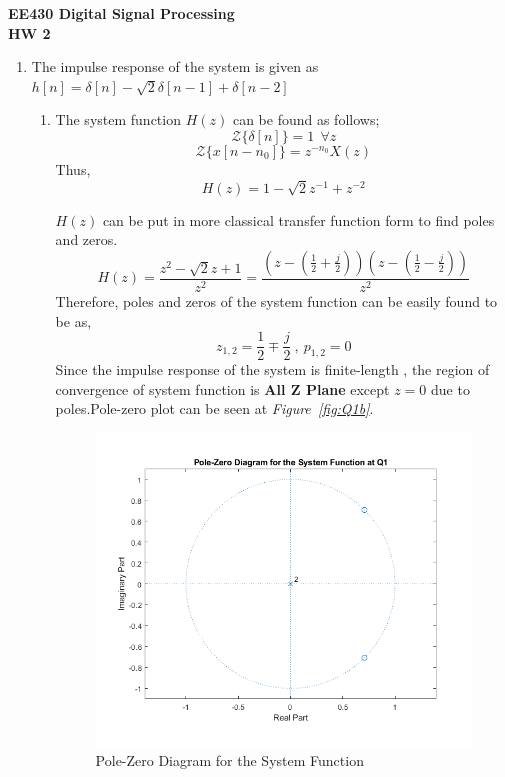 \documentclass[a4paper,12pt]{article}
\begin{document}
\begin{center}
	\textbf{\large EE430 Digital Signal Processing \\[0.2cm] HW 2} \\
\end{center}

\begin{enumerate}
	\item The impulse response of the system is given as $h[n]=\delta [n]-\sqrt{2}\delta [n-1]+\delta [n-2]$	
		
		\begin{enumerate} 
			\item The system function $H(z)$ can be found as follows;
				$$	\mathcal{Z} \{	\delta [n]\} = 1 \ \ \forall z	$$
				$$	\mathcal{Z} \{ x[n-n_0] \} = z^{-n_0}X(z)	$$ 
				Thus,
				$$\boxed{	H(z)= 1-\sqrt{2} z^{-1}+z^{-2}	 }$$
			
			$H(z)$ can be put in more classical transfer  function form to find poles and zeros. 
			$$	H(z)= \frac{z^2-\sqrt{2}z + 1}{z^2}=\frac{\left(z-(\frac{1}{2}+\frac{j}{2})\right)\left(z-(\frac{1}{2}-\frac{j}{2})\right)}{z^2}	$$
			Therefore, poles and zeros of the system function can be easily found to be as,
			$$\boxed{ z_{1,2}=\frac{1}{2} \mp \frac{j}{2} } \ , \ \boxed{ p_{1,2}=0 } $$
			Since the impulse response of the system is finite-length , the region of convergence of system function is \textbf{All Z Plane} except $z=0$ due to poles.Pole-zero plot can be seen at \textit{Figure~\ref{fig:Q1b}}.
			
			\begin{figure}[H]
				\center
				\setlength{\unitlength}{\textwidth} 
				\includegraphics[width=0.675\unitlength]{images/Q1ak}
				\caption{\label{fig:Q1a}Pole-Zero Diagram for the System Function }
			\end{figure}  
 			

\end{enumerate}
\end{enumerate}
\end{document}
